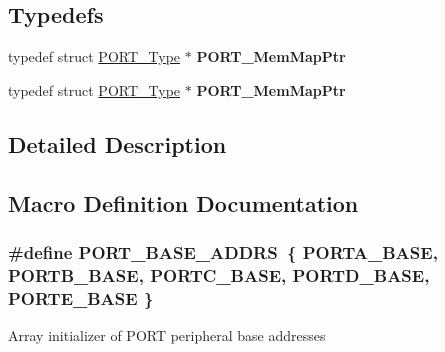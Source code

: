 \subsection*{Typedefs}
\begin{DoxyCompactItemize}
\item 
typedef struct \hyperlink{structPORT__Type}{P\+O\+R\+T\+\_\+\+Type} $\ast$ {\bfseries P\+O\+R\+T\+\_\+\+Mem\+Map\+Ptr}\hypertarget{group__PORT__Peripheral__Access__Layer_gaa0db94574a8e9a7d7de23f9fbecb0347}{}\label{group__PORT__Peripheral__Access__Layer_gaa0db94574a8e9a7d7de23f9fbecb0347}

\item 
typedef struct \hyperlink{structPORT__Type}{P\+O\+R\+T\+\_\+\+Type} $\ast$ {\bfseries P\+O\+R\+T\+\_\+\+Mem\+Map\+Ptr}\hypertarget{group__PORT__Peripheral__Access__Layer_gaa0db94574a8e9a7d7de23f9fbecb0347}{}\label{group__PORT__Peripheral__Access__Layer_gaa0db94574a8e9a7d7de23f9fbecb0347}

\end{DoxyCompactItemize}


\subsection{Detailed Description}


\subsection{Macro Definition Documentation}
\subsubsection[{\texorpdfstring{P\+O\+R\+T\+\_\+\+B\+A\+S\+E\+\_\+\+A\+D\+D\+RS}{PORT_BASE_ADDRS}}]{\setlength{\rightskip}{0pt plus 5cm}\#define P\+O\+R\+T\+\_\+\+B\+A\+S\+E\+\_\+\+A\+D\+D\+RS~\{ {\bf P\+O\+R\+T\+A\+\_\+\+B\+A\+SE}, {\bf P\+O\+R\+T\+B\+\_\+\+B\+A\+SE}, {\bf P\+O\+R\+T\+C\+\_\+\+B\+A\+SE}, {\bf P\+O\+R\+T\+D\+\_\+\+B\+A\+SE}, {\bf P\+O\+R\+T\+E\+\_\+\+B\+A\+SE} \}}\hypertarget{group__PORT__Peripheral__Access__Layer_ga80b01d00368494b63dd2a67eda52b241}{}\label{group__PORT__Peripheral__Access__Layer_ga80b01d00368494b63dd2a67eda52b241}
Array initializer of P\+O\+RT peripheral base addresses 
